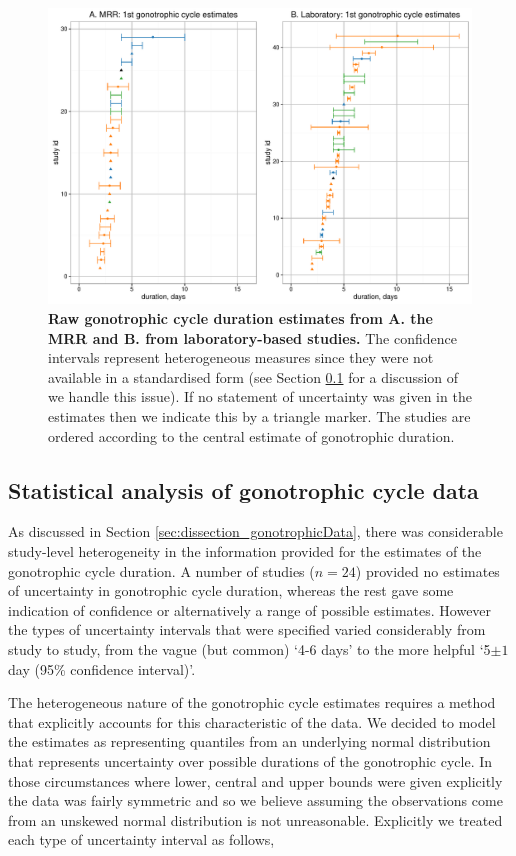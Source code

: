 \documentclass[12pt]{article}
\begin{document}
{\begin{figure}[ht]
	\centerline{\includegraphics[width=1\textwidth]{./Figure_files/dissection_gonotrophicCycleRaw_MRRVsLab.pdf}}
	\caption{\textbf{Raw gonotrophic cycle duration estimates from A. the MRR and B. from laboratory-based studies.} The confidence intervals represent heterogeneous measures since they were not available in a standardised form (see Section \ref{sec:dissection_gonotrophicMethod} for a discussion of we handle this issue). If no statement of uncertainty was given in the estimates then we indicate this by a triangle marker. The studies are ordered according to the central estimate of gonotrophic duration.}\label{fig:dissection_gonotrophicCycleRaw_MRRVsLab}
\end{figure}

\subsection{Statistical analysis of gonotrophic cycle data}\label{sec:dissection_gonotrophicMethod}
As discussed in Section \ref{sec:dissection_gonotrophicData}, there was considerable study-level heterogeneity in the information provided for the estimates of the gonotrophic cycle duration. A number of studies ($n=24$) provided no estimates of uncertainty in gonotrophic cycle duration, whereas the rest gave some indication of confidence or alternatively a range of possible estimates. However the types of uncertainty intervals that were specified varied considerably from study to study, from the vague (but common)  `4-6 days' to the more helpful `5$\pm 1$ day (95\% confidence interval)'. 

The heterogeneous nature of the gonotrophic cycle estimates requires a method that explicitly accounts for this characteristic of the data. We decided to model the estimates as representing quantiles from an underlying normal distribution that represents uncertainty over possible durations of the gonotrophic cycle. In those circumstances where lower, central and upper bounds were given explicitly the data was fairly symmetric and so we believe assuming the observations come from an unskewed normal distribution is not unreasonable. Explicitly we treated each type of uncertainty interval as follows,

}
\end{document}
